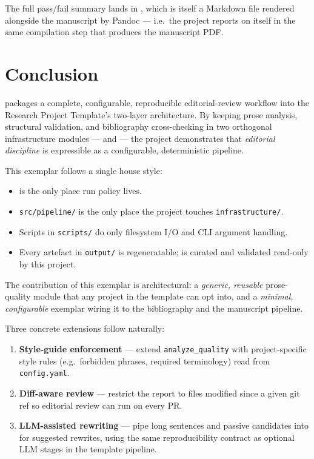 \documentclass[
]{article}
\providecommand{\tightlist}{%
  \setlength{\itemsep}{0pt}\setlength{\parskip}{0pt}}
\begin{document}
The full pass/fail summary lands in ,
which is itself a Markdown file rendered alongside the manuscript by
Pandoc --- i.e.~the project reports on itself in the same compilation
step that produces the manuscript PDF.

\newpage

\section{Conclusion}\label{sec:conclusion}

 packages a complete, configurable,
reproducible editorial-review workflow into the Research Project
Template's two-layer architecture. By keeping prose analysis, structural
validation, and bibliography cross-checking in two orthogonal
infrastructure modules ---  and
 --- the project demonstrates that
\emph{editorial discipline} is expressible as a configurable,
deterministic pipeline.

This exemplar follows a single house style:

\begin{itemize}
\tightlist
\item
   is the only place run policy lives.
\item
  \texttt{src/pipeline/} is the only place the project touches
  \texttt{infrastructure/}.
\item
  Scripts in \texttt{scripts/} do only filesystem I/O and CLI argument
  handling.
\item
  Every artefact in \texttt{output/} is regeneratable;
   is curated and validated read-only
  by this project.
\end{itemize}

The contribution of this exemplar is architectural: a \emph{generic,
reusable} prose-quality module that any project in the template can opt
into, and a \emph{minimal, configurable} exemplar wiring it to the
bibliography and the manuscript pipeline.

Three concrete extensions follow naturally:

\begin{enumerate}
\def\labelenumi{\arabic{enumi}.}
\tightlist
\item
  \textbf{Style-guide enforcement} --- extend \texttt{analyze\_quality}
  with project-specific style rules (e.g.~forbidden phrases, required
  terminology) read from \texttt{config.yaml}.
\item
  \textbf{Diff-aware review} --- restrict the report to files modified
  since a given git ref so editorial review can run on every PR.
\item
  \textbf{LLM-assisted rewriting} --- pipe long sentences and passive
  candidates into  for suggested rewrites,
  using the same  reproducibility
  contract as optional LLM stages in the template pipeline.
\end{enumerate}
\end{document}

